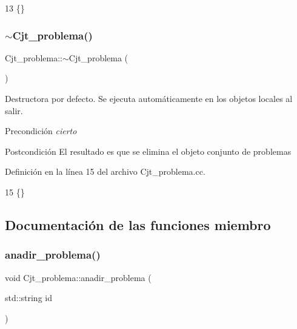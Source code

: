 \begin{DoxyCode}
13 \{\}
\end{DoxyCode}
\mbox{\label{class_cjt__problema_a8332d80bb4600f2c9d8da0ed68c87010}} 
\subsubsection{\texorpdfstring{$\sim$\+Cjt\+\_\+problema()}{~Cjt\_problema()}}
{\footnotesize\ttfamily Cjt\+\_\+problema\+::$\sim$\+Cjt\+\_\+problema (\begin{DoxyParamCaption}{ }\end{DoxyParamCaption})}



Destructora por defecto. Se ejecuta automáticamente en los objetos locales al salir. 

\begin{DoxyPrecond}{Precondición}
{\itshape cierto} 
\end{DoxyPrecond}
\begin{DoxyPostcond}{Postcondición}
El resultado es que se elimina el objeto conjunto de problemas 
\end{DoxyPostcond}


Definición en la línea 15 del archivo Cjt\+\_\+problema.\+cc.


\begin{DoxyCode}
15 \{\}
\end{DoxyCode}


\subsection{Documentación de las funciones miembro}
\mbox{\label{class_cjt__problema_a6086147f5615c1cf42d6d563682b080d}} 
\subsubsection{\texorpdfstring{anadir\+\_\+problema()}{anadir\_problema()}}
{\footnotesize\ttfamily void Cjt\+\_\+problema\+::anadir\+\_\+problema (\begin{DoxyParamCaption}\item[{std\+::string}]{id }\end{DoxyParamCaption})}



